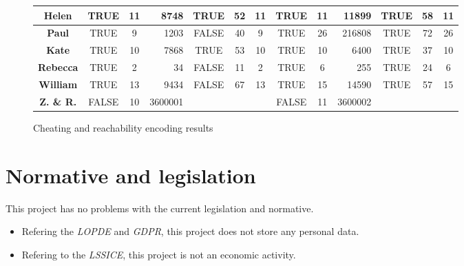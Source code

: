 \documentclass{report}
\theoremstyle{plain}
\begin{document}
\begin{figure}
\begin{tabular}{c|c|c|r|c|c|c|c|c|r|c|c|c|}
\multicolumn{1}{|c|}{\textbf{Helen}}                 & TRUE            & 11             & 8748          & TRUE           & 52               & 11                  & TRUE            & 11             & 11899         & TRUE           & 58               & 11                  \\ \hline
\multicolumn{1}{|c|}{\textbf{Paul}}                  & TRUE            & 9              & 1203          & FALSE          & 40               & 9                   & TRUE            & 26             & 216808        & TRUE           & 72               & 26                  \\ \hline
\multicolumn{1}{|c|}{\textbf{Kate}}                  & TRUE            & 10             & 7868          & TRUE           & 53               & 10                  & TRUE            & 10             & 6400          & TRUE           & 37               & 10                  \\ \hline
\multicolumn{1}{|c|}{\textbf{Rebecca}}               & TRUE            & 2              & 34            & FALSE          & 11               & 2                   & TRUE            & 6              & 255           & TRUE           & 24               & 6                   \\ \hline
\multicolumn{1}{|c|}{\textbf{William}}               & TRUE            & 13             & 9434          & FALSE          & 67               & 13                  & TRUE            & 15             & 14590         & TRUE           & 57               & 15                  \\ \hline
\multicolumn{1}{|c|}{\textbf{Z. \& R.}}        & FALSE           & 10             & 3600001       &                &                  &                     & FALSE           & 11             & 3600002       &                &                  &                     \\ \hline
\end{tabular}
    \caption{Cheating and reachability encoding results}
    \label{fig:results-2}
\end{figure}

\section{Normative and legislation}
This project has no problems with the current legislation and normative.
\begin{itemize}
    \item Refering the \emph{LOPDE} and \emph{GDPR}, this project does not store any personal data.
    \item Refering to the \emph{LSSICE}, this project is not an economic activity.
\end{itemize}
\end{document}
